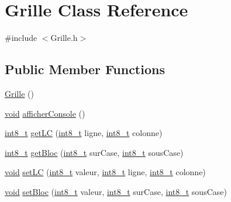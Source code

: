 \hypertarget{class_grille}{}\section{Grille Class Reference}
\label{class_grille}


{\ttfamily \#include $<$Grille.\+h$>$}

\subsection*{Public Member Functions}
\begin{DoxyCompactItemize}
\item 
\hyperlink{class_grille_a442706ca3dc66a38b219ff9b7acb2228}{Grille} ()
\item 
\hyperlink{_s_d_l__opengl_8h_a3db05964a3cc4410f35b7ea2b7eb850d}{void} \hyperlink{class_grille_ad52857ed7b5699042dba5f07a09d6131}{afficher\+Console} ()
\item 
\hyperlink{_s_d_l__config__dreamcast_8h_aef44329758059c91c76d334e8fc09700}{int8\+\_\+t} \hyperlink{class_grille_ad3533300845e9c334f4d7c5687c1c42d}{get\+L\+C} (\hyperlink{_s_d_l__config__dreamcast_8h_aef44329758059c91c76d334e8fc09700}{int8\+\_\+t} ligne, \hyperlink{_s_d_l__config__dreamcast_8h_aef44329758059c91c76d334e8fc09700}{int8\+\_\+t} colonne)
\item 
\hyperlink{_s_d_l__config__dreamcast_8h_aef44329758059c91c76d334e8fc09700}{int8\+\_\+t} \hyperlink{class_grille_a0434c81275f5854d63c6ea4a7a0be506}{get\+Bloc} (\hyperlink{_s_d_l__config__dreamcast_8h_aef44329758059c91c76d334e8fc09700}{int8\+\_\+t} sur\+Case, \hyperlink{_s_d_l__config__dreamcast_8h_aef44329758059c91c76d334e8fc09700}{int8\+\_\+t} sous\+Case)
\item 
\hyperlink{_s_d_l__opengl_8h_a3db05964a3cc4410f35b7ea2b7eb850d}{void} \hyperlink{class_grille_a63b5d8370591c1226be85778ea750194}{set\+L\+C} (\hyperlink{_s_d_l__config__dreamcast_8h_aef44329758059c91c76d334e8fc09700}{int8\+\_\+t} valeur, \hyperlink{_s_d_l__config__dreamcast_8h_aef44329758059c91c76d334e8fc09700}{int8\+\_\+t} ligne, \hyperlink{_s_d_l__config__dreamcast_8h_aef44329758059c91c76d334e8fc09700}{int8\+\_\+t} colonne)
\item 
\hyperlink{_s_d_l__opengl_8h_a3db05964a3cc4410f35b7ea2b7eb850d}{void} \hyperlink{class_grille_a64d59aaaf414af9b079da1f39a730fd0}{set\+Bloc} (\hyperlink{_s_d_l__config__dreamcast_8h_aef44329758059c91c76d334e8fc09700}{int8\+\_\+t} valeur, \hyperlink{_s_d_l__config__dreamcast_8h_aef44329758059c91c76d334e8fc09700}{int8\+\_\+t} sur\+Case, \hyperlink{_s_d_l__config__dreamcast_8h_aef44329758059c91c76d334e8fc09700}{int8\+\_\+t} sous\+Case)

\end{DoxyCompactItemize}
